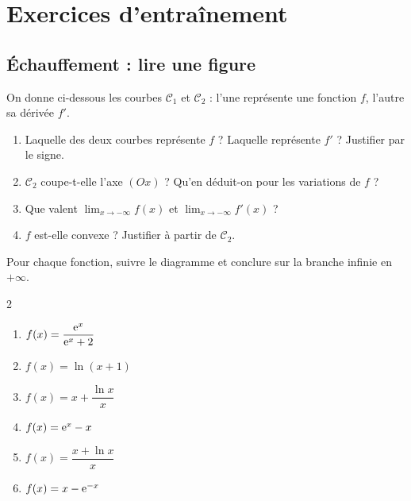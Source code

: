 \section{Exercices d'entraînement}

\subsection{Échauffement : lire une figure}

On donne ci-dessous les courbes $\mathcal C_1$ et $\mathcal C_2$ : l'une
représente une fonction $f$, l'autre sa dérivée $f'$.

\begin{center}
\end{center}

\begin{enumerate}
	\item Laquelle des deux courbes représente $f$ ? Laquelle représente $f'$ ?
	Justifier par le signe.
	\item $\mathcal C_2$ coupe-t-elle l'axe $(Ox)$ ? Qu'en déduit-on pour les
	variations de $f$ ?
	\item Que valent $\displaystyle\lim_{x\to-\infty}f(x)$ et
	$\displaystyle\lim_{x\to-\infty}f'(x)$ ?
	\item $f$ est-elle convexe ? Justifier à partir de $\mathcal C_2$.
\end{enumerate}

Pour chaque fonction, suivre le diagramme et conclure sur la branche
infinie en $+\infty$.
\begin{multicols}{2}
\begin{enumerate}
	\item $f(x)=\dfrac{\mathrm{e}^{x}}{\mathrm{e}^{x}+2}$
	\item $f(x)=\ln(x+1)$
	\item $f(x)=x+\dfrac{\ln x}{x}$
	\item $f(x)=\mathrm{e}^{x}-x$
	\item $f(x)=\dfrac{x+\ln x}{x}$
	\item $f(x)=x-\mathrm{e}^{-x}$
\end{enumerate}
\end{multicols}

